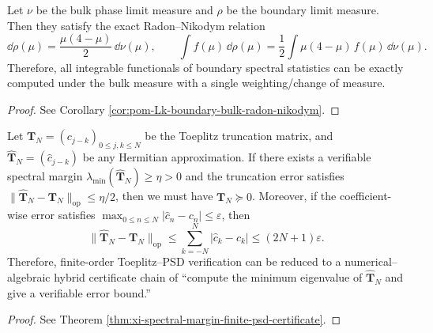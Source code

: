 \begin{conclusion}[Boundary spectral law is a strict quadratic tilt of the bulk spectral law: \texorpdfstring{$\dd\rho(\mu)=\frac{\mu(4-\mu)}{2}\,\dd\nu(\mu)$}{d rho=(mu(4-mu)/2)d nu}]\label{con:xi-terminal-boundary-bulk-spectral-quadratic-tilt}
Let \(\nu\) be the bulk phase limit measure and \(\rho\) be the boundary limit measure.
Then they satisfy the exact Radon--Nikodym relation
\[
\dd\rho(\mu)=\frac{\mu(4-\mu)}{2}\,\dd\nu(\mu),
\qquad
\int f(\mu)\,\dd\rho(\mu)=\frac12\int \mu(4-\mu)\,f(\mu)\,\dd\nu(\mu).
\]
Therefore, all integrable functionals of boundary spectral statistics can be exactly computed under the bulk measure with a single weighting/change of measure.
\end{conclusion}
\begin{proof}
See Corollary \ref{cor:pom-Lk-boundary-bulk-radon-nikodym}.
\end{proof}
\begin{conclusion}\label{con:xi-terminal-toeplitz-psd-numerical-robustness}
Let \(\mathbf{T}_N=(c_{j-k})_{0\le j,k\le N}\) be the Toeplitz truncation matrix, and \(\widehat{\mathbf{T}}_N=(\widehat c_{j-k})\) be any Hermitian approximation.
If there exists a verifiable spectral margin \(\lambda_{\min}(\widehat{\mathbf{T}}_N)\ge\eta>0\) and the truncation error satisfies
\(
\|\widehat{\mathbf{T}}_N-\mathbf{T}_N\|_{\mathrm{op}}\le \eta/2
\),
then we must have \(\mathbf{T}_N\succeq 0\).
Moreover, if the coefficient-wise error satisfies \(\max_{0\le n\le N}|\widehat c_n-c_n|\le\varepsilon\), then
\[
\|\widehat{\mathbf{T}}_N-\mathbf{T}_N\|_{\mathrm{op}}
\le\sum_{k=-N}^{N}|\widehat c_k-c_k|
\le (2N+1)\varepsilon.
\]
Therefore, finite-order Toeplitz--PSD verification can be reduced to a numerical--algebraic hybrid certificate chain of ``compute the minimum eigenvalue of \(\widehat{\mathbf{T}}_N\) and give a verifiable error bound.''
\end{conclusion}
\begin{proof}
See Theorem \ref{thm:xi-spectral-margin-finite-psd-certificate}.
\end{proof}
